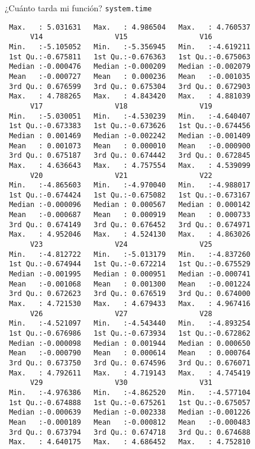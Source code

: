 \documentclass[xcolor={usenames,svgnames,dvipsnames}]{beamer}
\begin{document}
\begin{frame}[label={sec:org4570aee},fragile]{¿Cuánto tarda mi función? \texttt{system.time}}
\begin{verbatim}
 Max.   : 5.031631   Max.   : 4.986504   Max.   : 4.760537  
      V14                 V15                 V16           
 Min.   :-5.105052   Min.   :-5.356945   Min.   :-4.619211  
 1st Qu.:-0.675811   1st Qu.:-0.676363   1st Qu.:-0.675063  
 Median :-0.000476   Median :-0.000209   Median :-0.002079  
 Mean   :-0.000727   Mean   : 0.000236   Mean   :-0.001035  
 3rd Qu.: 0.676599   3rd Qu.: 0.675304   3rd Qu.: 0.672903  
 Max.   : 4.788265   Max.   : 4.843420   Max.   : 4.881039  
      V17                 V18                 V19           
 Min.   :-5.030051   Min.   :-4.530239   Min.   :-4.640407  
 1st Qu.:-0.673383   1st Qu.:-0.673626   1st Qu.:-0.674456  
 Median : 0.001469   Median :-0.002242   Median :-0.001409  
 Mean   : 0.001073   Mean   : 0.000010   Mean   :-0.000900  
 3rd Qu.: 0.675187   3rd Qu.: 0.674442   3rd Qu.: 0.672845  
 Max.   : 4.636643   Max.   : 4.757554   Max.   : 4.539099  
      V20                 V21                 V22           
 Min.   :-4.865603   Min.   :-4.970040   Min.   :-4.988017  
 1st Qu.:-0.674424   1st Qu.:-0.675082   1st Qu.:-0.673167  
 Median :-0.000096   Median : 0.000567   Median : 0.000142  
 Mean   :-0.000687   Mean   : 0.000919   Mean   : 0.000733  
 3rd Qu.: 0.674149   3rd Qu.: 0.676452   3rd Qu.: 0.674971  
 Max.   : 4.952046   Max.   : 4.524130   Max.   : 4.863026  
      V23                 V24                 V25           
 Min.   :-4.812722   Min.   :-5.013179   Min.   :-4.837260  
 1st Qu.:-0.674944   1st Qu.:-0.672214   1st Qu.:-0.675529  
 Median :-0.001995   Median : 0.000951   Median :-0.000741  
 Mean   :-0.001068   Mean   : 0.001300   Mean   :-0.001224  
 3rd Qu.: 0.672623   3rd Qu.: 0.676519   3rd Qu.: 0.674000  
 Max.   : 4.721530   Max.   : 4.679433   Max.   : 4.967416  
      V26                 V27                 V28           
 Min.   :-4.521097   Min.   :-4.543440   Min.   :-4.893254  
 1st Qu.:-0.676986   1st Qu.:-0.673934   1st Qu.:-0.672862  
 Median :-0.000098   Median : 0.001944   Median : 0.000650  
 Mean   :-0.000790   Mean   : 0.000614   Mean   : 0.000764  
 3rd Qu.: 0.673750   3rd Qu.: 0.674596   3rd Qu.: 0.676071  
 Max.   : 4.792611   Max.   : 4.719143   Max.   : 4.745419  
      V29                 V30                 V31           
 Min.   :-4.976386   Min.   :-4.862520   Min.   :-4.577104  
 1st Qu.:-0.674888   1st Qu.:-0.675261   1st Qu.:-0.675057  
 Median :-0.000639   Median :-0.002338   Median :-0.001226  
 Mean   :-0.000189   Mean   :-0.000812   Mean   :-0.000483  
 3rd Qu.: 0.673794   3rd Qu.: 0.674718   3rd Qu.: 0.674688  
 Max.   : 4.640175   Max.   : 4.686452   Max.   : 4.752810  

\end{verbatim}
\end{frame}
\end{document}
